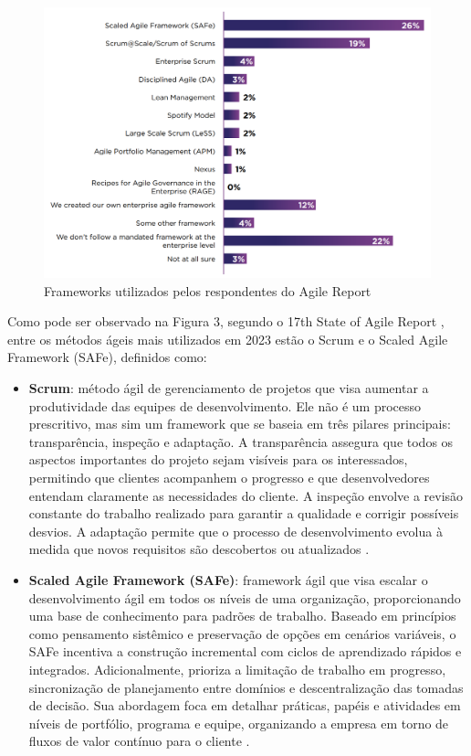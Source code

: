 \documentclass[
	12pt,
	openright,
	twoside,
	a4paper,
	english,
	brazil
	]{abntex2}
\begin{document}
\begin{figure}[H]
	\caption{\label{annual-agile-report}Frameworks utilizados pelos respondentes do Agile Report}
  \includegraphics[width=\textwidth]{annual-agile-report}
\end{figure}

Como pode ser observado na Figura 3, segundo o 17th State of Agile Report \cite{17_agile_report}, entre os métodos ágeis mais utilizados em 2023 estão o Scrum e o Scaled Agile Framework (SAFe), definidos como:
\begin{itemize}
  \item \textbf{Scrum}: método ágil de gerenciamento de projetos que visa aumentar a produtividade das equipes de desenvolvimento. Ele não é um processo prescritivo, mas sim um framework que se baseia em três pilares principais: transparência, inspeção e adaptação. A transparência assegura que todos os aspectos importantes do projeto sejam visíveis para os interessados, permitindo que clientes acompanhem o progresso e que desenvolvedores entendam claramente as necessidades do cliente. A inspeção envolve a revisão constante do trabalho realizado para garantir a qualidade e corrigir possíveis desvios. A adaptação permite que o processo de desenvolvimento evolua à medida que novos requisitos são descobertos ou atualizados \cite{wazlawick2019}.
  \item \textbf{Scaled Agile Framework (SAFe)}: framework ágil que visa escalar o desenvolvimento ágil em todos os níveis de uma organização, proporcionando uma base de conhecimento para padrões de trabalho. Baseado em princípios como pensamento sistêmico e preservação de opções em cenários variáveis, o SAFe incentiva a construção incremental com ciclos de aprendizado rápidos e integrados. Adicionalmente, prioriza a limitação de trabalho em progresso, sincronização de planejamento entre domínios e descentralização das tomadas de decisão. Sua abordagem foca em detalhar práticas, papéis e atividades em níveis de portfólio, programa e equipe, organizando a empresa em torno de fluxos de valor contínuo para o cliente \cite{AgileGuide}.
\end{itemize}
  
\end{document}
